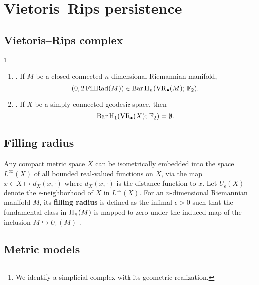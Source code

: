 
\section{Vietoris--Rips persistence}\label{s:preliminaries}

\subsection{Vietoris--Rips complex}\label{ss:vietoris-rips}

\footnote{We identify a simplicial complex with its geometric realization.}

\begin{enumerate}
	\item\label{prop:manifold} {\rm \cite[Prop.~9.4]{lim2020vietoris}}.
	If $M$ be a closed connected $n$-dimensional Riemannian manifold,
	\[
	(0,2\operatorname{FillRad}(M)) \in \operatorname{Bar} \operatorname{H}_{n}(\operatorname{VR}_\bullet(M);\,{\mathbb{F}_2}).
	\]

	\item\label{prop:pH1} {\rm \cite[Prop.~7.10]{virk20201}}.
	If $X$ be a simply-connected geodesic space, then
	\[
	\operatorname{Bar} \operatorname{H}_{1}(\operatorname{VR}_\bullet(X);\,{\mathbb{F}_2}) = \emptyset.
	\]
\end{enumerate}

\subsection{Filling radius}\label{ss:filling_radius}

Any compact metric space $X$ can be isometrically embedded into the space $L^\infty(X)$ of all bounded real-valued functions on $X$, via the map $x\in X\mapsto d_X(x,\cdot)$ where $d_X(x,\cdot)$ is the distance function to $x$. Let $U_\epsilon(X)$ denote the $\epsilon$-neighborhood of $X$ in $L^\infty(X)$.
For an $n$-dimensional Riemannian manifold $M$, its \textbf{filling radius} is defined as the infimal $\epsilon>0$ such that the fundamental class in $\operatorname{H}_n(M)$ is mapped to zero under the induced map of the inclusion $M\hookrightarrow U_\epsilon(M)$ \cite[page 108]{gromov2007metric}.

\subsection{Metric models}

